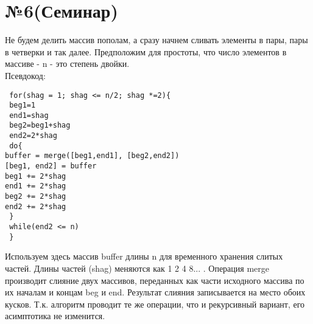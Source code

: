 \documentclass[a4paper,12pt]{article} %
\begin{document}
 \section*{№6(Семинар)}
 Не будем делить массив пополам, а сразу начнем сливать элементы в пары, пары в четверки и так далее. Предположим для простоты, что число элементов в массиве - n - это степень двойки.\\
 Псевдокод:\\
 \begin{lstlisting}
 for(shag = 1; shag <= n/2; shag *=2){
 beg1=1
 end1=shag
 beg2=beg1+shag
 end2=2*shag
 do{
buffer = merge([beg1,end1], [beg2,end2])
[beg1, end2] = buffer
beg1 += 2*shag
end1 += 2*shag 
beg2 += 2*shag 
end2 += 2*shag 
 }
 while(end2 <= n)
 }
  \end{lstlisting}
  Используем здесь массив buffer длины n для временного хранения слитых частей. Длины частей (shag) меняются как 1 2 4 8... . Операция merge  производит слияние двух массивов, переданных как части исходного массива по их началам и концам beg и end. Результат слияния записывается на место обоих кусков. Т.к. алгоритм проводит  те же операции, что и рекурсивный вариант, его асимптотика не изменится.\\
  
\end{document}
